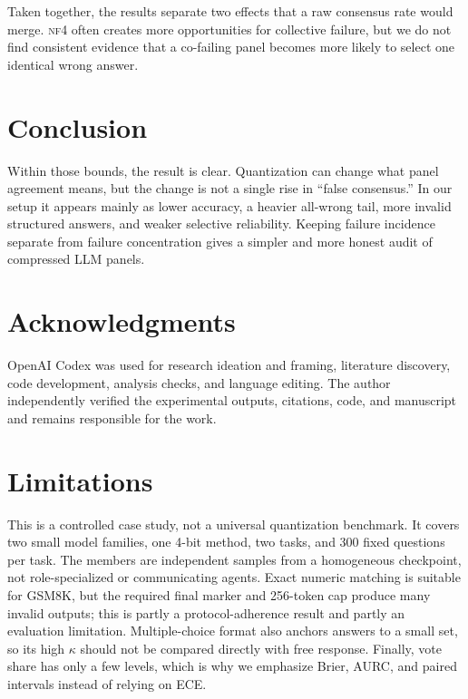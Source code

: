 \documentclass[11pt]{article}
\newcommand{\nf}{\textsc{nf4}}
\begin{document}
Taken together, the results separate two effects that a raw consensus rate would merge. \nf{} often creates more opportunities for collective failure, but we do not find consistent evidence that a co-failing panel becomes more likely to select one identical wrong answer.

\section{Conclusion}

Within those bounds, the result is clear. Quantization can change what panel agreement means, but the change is not a single rise in ``false consensus.'' In our setup it appears mainly as lower accuracy, a heavier all-wrong tail, more invalid structured answers, and weaker selective reliability. Keeping failure incidence separate from failure concentration gives a simpler and more honest audit of compressed LLM panels.

\section*{Acknowledgments}

OpenAI Codex was used for research ideation and framing, literature discovery, code development, analysis checks, and language editing. The author independently verified the experimental outputs, citations, code, and manuscript and remains responsible for the work.

\section{Limitations}

This is a controlled case study, not a universal quantization benchmark. It covers two small model families, one 4-bit method, two tasks, and 300 fixed questions per task. The members are independent samples from a homogeneous checkpoint, not role-specialized or communicating agents. Exact numeric matching is suitable for GSM8K, but the required final marker and 256-token cap produce many invalid outputs; this is partly a protocol-adherence result and partly an evaluation limitation. Multiple-choice format also anchors answers to a small set, so its high $\kappa$ should not be compared directly with free response. Finally, vote share has only a few levels, which is why we emphasize Brier, AURC, and paired intervals instead of relying on ECE.


\end{document}

